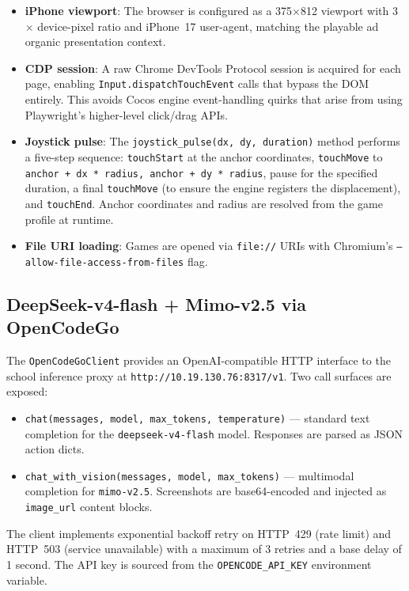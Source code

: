 \documentclass[11pt,a4paper]{article}
\begin{document}
\begin{itemize}[leftmargin=*,itemsep=2pt]
  \item \textbf{iPhone viewport}: The browser is configured as a 375$\times$812 viewport with 3$\times$ device-pixel ratio and iPhone~17 user-agent, matching the playable ad organic presentation context.
  \item \textbf{CDP session}: A raw Chrome DevTools Protocol session is acquired for each page, enabling \texttt{Input.dispatchTouchEvent} calls that bypass the DOM entirely. This avoids Cocos engine event-handling quirks that arise from using Playwright's higher-level click/drag APIs.
  \item \textbf{Joystick pulse}: The \texttt{joystick\_pulse(dx, dy, duration)} method performs a five-step sequence: \texttt{touchStart} at the anchor coordinates, \texttt{touchMove} to \texttt{anchor + dx * radius, anchor + dy * radius}, pause for the specified duration, a final \texttt{touchMove} (to ensure the engine registers the displacement), and \texttt{touchEnd}. Anchor coordinates and radius are resolved from the game profile at runtime.
  \item \textbf{File URI loading}: Games are opened via \texttt{file://} URIs with Chromium's \texttt{--allow-file-access-from-files} flag.
\end{itemize}

\subsection{DeepSeek-v4-flash + Mimo-v2.5 via OpenCodeGo}

The \texttt{OpenCodeGoClient} provides an OpenAI-compatible HTTP interface to the school inference proxy at \texttt{http://10.19.130.76:8317/v1}. Two call surfaces are exposed:

\begin{itemize}[leftmargin=*,itemsep=2pt]
  \item \texttt{chat(messages, model, max\_tokens, temperature)} — standard text completion for the \texttt{deepseek-v4-flash} model. Responses are parsed as JSON action dicts.
  \item \texttt{chat\_with\_vision(messages, model, max\_tokens)} — multimodal completion for \texttt{mimo-v2.5}. Screenshots are base64-encoded and injected as \texttt{image\_url} content blocks.
\end{itemize}

The client implements exponential backoff retry on HTTP~429 (rate limit) and HTTP~503 (service unavailable) with a maximum of 3 retries and a base delay of 1 second. The API key is sourced from the \texttt{OPENCODE\_API\_KEY} environment variable.
\end{document}
